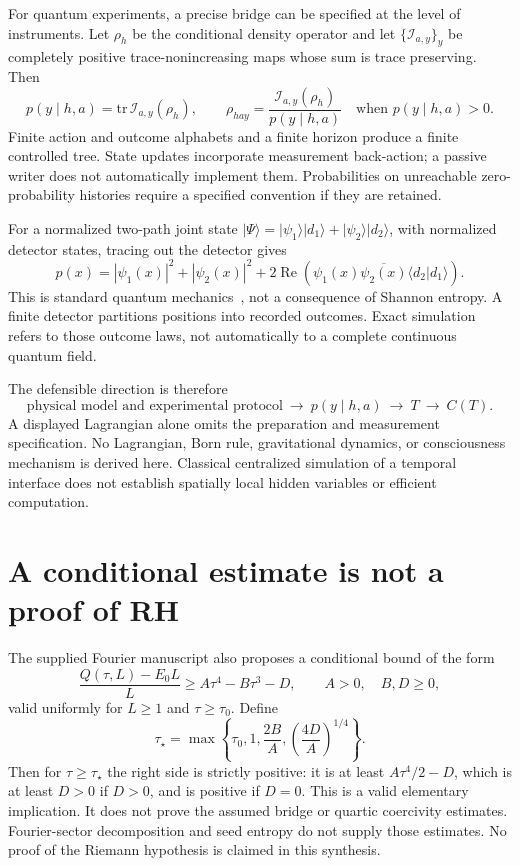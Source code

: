 \documentclass[11pt]{article}
\theoremstyle{remark}\newtheorem{remark}[theorem]{Remark}
\begin{document}
For quantum experiments, a precise bridge can be specified at the level of
instruments. Let $\rho_h$ be the conditional density operator and let
$\{\mathcal I_{a,y}\}_y$ be completely positive trace-nonincreasing maps
whose sum is trace preserving. Then
\[
 p(y\mid h,a)=\mathrm{tr}\,\mathcal I_{a,y}(\rho_h),\qquad
 \rho_{hay}=\frac{\mathcal I_{a,y}(\rho_h)}{p(y\mid h,a)}
 \quad\text{when }p(y\mid h,a)>0.
\]
Finite action and outcome alphabets and a finite horizon produce a finite
controlled tree. State updates incorporate measurement back-action; a passive
writer does not automatically implement them. Probabilities on unreachable
zero-probability histories require a specified convention if they are retained.

For a normalized two-path joint state
$|\Psi\rangle=|\psi_1\rangle|d_1\rangle+|\psi_2\rangle|d_2\rangle$,
with normalized detector states, tracing out the detector gives
\[
 p(x)=|\psi_1(x)|^2+|\psi_2(x)|^2+
 2\operatorname{Re}\!\left(\psi_1(x)\overline{\psi_2(x)}
 \langle d_2|d_1\rangle\right).
\]
This is standard quantum mechanics~\cite{feynman,nc}, not a consequence of
Shannon entropy. A finite detector partitions positions into recorded outcomes.
Exact simulation refers to those outcome laws, not automatically to a complete
continuous quantum field.

The defensible direction is therefore
\[
 \text{physical model and experimental protocol}
 \ \longrightarrow\ p(y\mid h,a)\ \longrightarrow\ T
 \ \longrightarrow\ C(T).
\]
A displayed Lagrangian alone omits the preparation and measurement specification.
No Lagrangian, Born rule, gravitational dynamics, or consciousness mechanism is
derived here. Classical centralized simulation of a temporal interface does not
establish spatially local hidden variables or efficient computation.

\section{A conditional estimate is not a proof of RH}
The supplied Fourier manuscript also proposes a conditional bound of the form
\[
 \frac{Q(\tau,L)-E_0L}{L}\ge A\tau^4-B\tau^3-D,
 \qquad A>0,\quad B,D\ge0,
\]
valid uniformly for $L\ge1$ and $\tau\ge\tau_0$. Define
\[
 \tau_\star=\max\left\{\tau_0,1,\frac{2B}{A},
                         \left(\frac{4D}{A}\right)^{1/4}\right\}.
\]
Then for $\tau\ge\tau_\star$ the right side is strictly positive: it is at
least $A\tau^4/2-D$, which is at least $D>0$ if $D>0$, and is positive if
$D=0$. This is a valid elementary implication. It does not prove the assumed
bridge or quartic coercivity estimates. Fourier-sector decomposition and seed
entropy do not supply those estimates. No proof of the Riemann hypothesis is
claimed in this synthesis.
\end{document}
